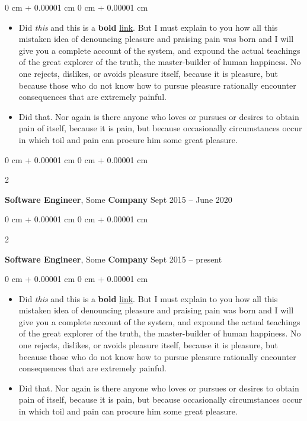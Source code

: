 \documentclass[10pt, letterpaper]{article}
\newenvironment{highlights}{
    \begin{itemize}[
        topsep=0.10 cm,
        parsep=0.10 cm,
        partopsep=0pt,
        itemsep=0pt,
        leftmargin=0 cm + 10pt
    ]
}{
    \end{itemize}
} %
\newenvironment{onecolentry}{
    \begin{adjustwidth}{
        0 cm + 0.00001 cm
    }{
        0 cm + 0.00001 cm
    }
}{
    \end{adjustwidth}
} %
\newenvironment{twocolentry}[2][]{
    \onecolentry
    \def\secondColumn{#2}
    \setcolumnwidth{\fill, 4.5 cm}
    \begin{paracol}{2}
}{
    \switchcolumn \raggedleft \secondColumn
    \end{paracol}
    \endonecolentry
} %
\begin{document}
        \vspace{0.10 cm}
        \begin{onecolentry}
            \begin{highlights}
                \item Did \textit{this} and this is a \textbf{bold} \href{https://example.com}{link}. But I must explain to you how all this mistaken idea of denouncing pleasure and praising pain was born and I will give you a complete account of the system, and expound the actual teachings of the great explorer of the truth, the master-builder of human happiness. No one rejects, dislikes, or avoids pleasure itself, because it is pleasure, but because those who do not know how to pursue pleasure rationally encounter consequences that are extremely painful.
                \item Did that. Nor again is there anyone who loves or pursues or desires to obtain pain of itself, because it is pain, but because occasionally circumstances occur in which toil and pain can procure him some great pleasure.
            \end{highlights}
        \end{onecolentry}


        \vspace{0.2 cm}

        \begin{twocolentry}{
            Sept 2015 – June 2020
        }
            \textbf{Software Engineer}, Some \textbf{Company}\end{twocolentry}



        \vspace{0.2 cm}

        \begin{twocolentry}{
            Sept 2015 – present
        }
            \textbf{Software Engineer}, Some \textbf{Company}\end{twocolentry}

        \vspace{0.10 cm}
        \begin{onecolentry}
            \begin{highlights}
                \item Did \textit{this} and this is a \textbf{bold} \href{https://example.com}{link}. But I must explain to you how all this mistaken idea of denouncing pleasure and praising pain was born and I will give you a complete account of the system, and expound the actual teachings of the great explorer of the truth, the master-builder of human happiness. No one rejects, dislikes, or avoids pleasure itself, because it is pleasure, but because those who do not know how to pursue pleasure rationally encounter consequences that are extremely painful.
                \item Did that. Nor again is there anyone who loves or pursues or desires to obtain pain of itself, because it is pain, but because occasionally circumstances occur in which toil and pain can procure him some great pleasure.
            \end{highlights}
        \end{onecolentry}
\end{document}
